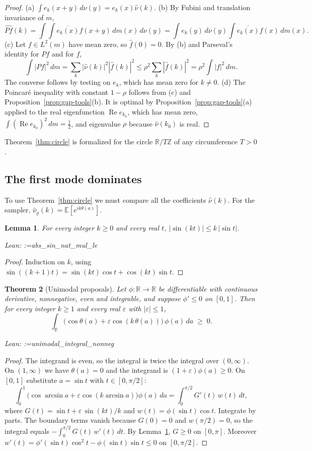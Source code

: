 \documentclass[11pt]{amsart}
\makeatletter
\newtheorem{theorem}{Theorem}[section]
\newtheorem{lemma}[theorem]{Lemma}
\theoremstyle{definition}
\theoremstyle{remark}
\newcommand{\@leanlist}[1]{\def\@leansep{}\@for\@leanname:=#1\do{\@leansep
  \texttt{\expandafter\detokenize\expandafter{\@leanname}}\def\@leansep{, }}}
\newcommand{\lean}[1]{\par\smallskip\noindent
  {\footnotesize\normalfont\raggedright\textsf{Lean:} \@leanlist{#1}\par}}
\newcommand{\R}{\mathbb{R}}
\newcommand{\Z}{\mathbb{Z}}
\newcommand{\E}{\mathbb{E}}
\newcommand{\re}{\operatorname{Re}}
\makeatother
\begin{document}
\begin{proof}
(a) $\int e_k(x+y)\,d\nu(y)=e_k(x)\hat\nu(k)$.  (b) By Fubini and translation invariance of $m$,
\[
  \widehat{Pf}(k)=\int\!\!\int\overline{e_k(x)}f(x+y)\,dm(x)\,d\nu(y)
  =\int e_k(y)\,d\nu(y)\int\overline{e_k(x)}f(x)\,dm(x).
\]
(c) Let $f\in L^2(m)$ have mean zero, so $\hat f(0)=0$.  By (b) and Parseval's identity for $Pf$
and for $f$,
\[
  \int|Pf|^2\,dm=\sum_k|\hat\nu(k)|^2|\hat f(k)|^2\le\rho^2\sum_{k}|\hat f(k)|^2=\rho^2\int|f|^2\,dm .
\]
The converse follows by testing on $e_k$, which has mean zero for $k\ne0$.  (d) The Poincar\'e
inequality with constant $1-\rho$ follows from (c) and Proposition~\ref{prop:gap-tools}(b).  It
is optimal by Proposition~\ref{prop:gap-tools}(a) applied to the real eigenfunction
$\re e_{k_0}$, which has mean zero, $\int(\re e_{k_0})^2\,dm=\tfrac12$, and eigenvalue $\rho$
because $\hat\nu(k_0)$ is real.
\end{proof}

Theorem~\ref{thm:circle} is formalized for the circle $\R/T\Z$ of any circumference $T>0$.

\subsection{The first mode dominates}
To use Theorem~\ref{thm:circle} we must compare all the coefficients $\hat\nu(k)$.  For the
sampler, $\hat\nu_\varrho(k)=\E[e^{ik\theta(a)}]$.

\begin{lemma}\label{lem:sin}
For every integer $k\ge0$ and every real $t$, $|\sin(kt)|\le k\,|\sin t|$.
\lean{abs_sin_nat_mul_le}
\end{lemma}

\begin{proof}
Induction on $k$, using $\sin((k+1)t)=\sin(kt)\cos t+\cos(kt)\sin t$.
\end{proof}

\begin{theorem}[Unimodal proposals]\label{thm:unimodal}
Let $\phi\colon\R\to\R$ be differentiable with continuous derivative, nonnegative, even and
integrable, and suppose $\phi'\le0$ on $[0,1]$.  Then for every integer $k\ge1$ and every real
$\varepsilon$ with $|\varepsilon|\le1$,
\[
  \int_{\R}\bigl(\cos\theta(a)+\varepsilon\cos(k\,\theta(a))\bigr)\,\phi(a)\,da\;\ge\;0 .
\]
\lean{unimodal_integral_nonneg}
\end{theorem}

\begin{proof}
The integrand is even, so the integral is twice the integral over $(0,\infty)$.  On $(1,\infty)$
we have $\theta(a)=0$ and the integrand is $(1+\varepsilon)\phi(a)\ge0$.  On $[0,1]$ substitute
$a=\sin t$ with $t\in[0,\pi/2]$:
\[
  \int_0^1\bigl(\cos\arcsin a+\varepsilon\cos(k\arcsin a)\bigr)\phi(a)\,da
  =\int_0^{\pi/2}G'(t)\,w(t)\,dt,
\]
where $G(t)=\sin t+\varepsilon\,\sin(kt)/k$ and $w(t)=\phi(\sin t)\cos t$.  Integrate by parts.
The boundary terms vanish because $G(0)=0$ and $w(\pi/2)=0$, so the integral equals
$-\int_0^{\pi/2}G(t)\,w'(t)\,dt$.  By Lemma~\ref{lem:sin}, $G\ge0$ on $[0,\pi]$.  Moreover
$w'(t)=\phi'(\sin t)\cos^2t-\phi(\sin t)\sin t\le0$ on $[0,\pi/2]$.
\end{proof}
\end{document}
